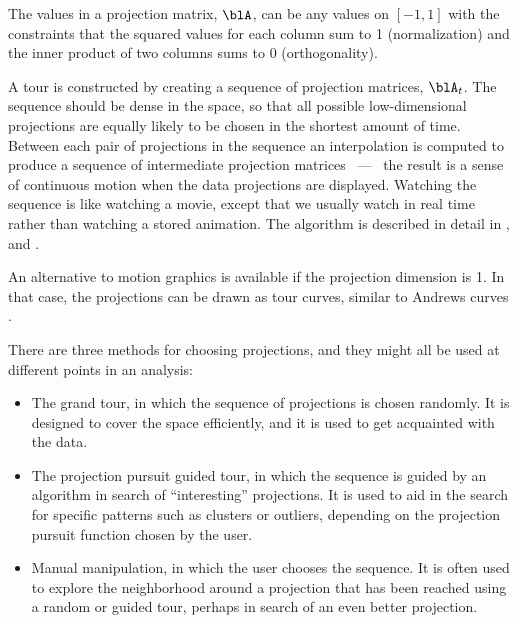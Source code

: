 The values in a projection matrix, $\blA$, can be any values on
$[-1,1]$ with the constraints that the squared values for each column
sum to 1 (normalization) and the inner product of two columns sums to
0 (orthogonality).

A tour  is constructed by creating a sequence of
projection matrices, $\blA_t$. The sequence should be dense in the
space, so that all possible low-dimensional projections are equally
likely to be chosen in the shortest amount of time. Between each pair
of projections in the sequence an interpolation is computed to produce
a sequence of intermediate projection matrices ~---~ the result is a
sense of continuous motion when the data projections are
displayed. Watching the sequence is like watching a movie, except that
we usually watch in real time rather than watching a stored
animation. The algorithm is described in detail in
, and .

An alternative to motion graphics is available if the projection
dimension is 1.  In that case, the projections can be drawn as tour
curves, similar to Andrews curves \cite{An72}.


\bigskip
{} 
There are three methods for choosing projections, and they might
all be used at different points in an analysis:

\begin{itemize}
\item The grand tour,  in which the sequence of
  projections is chosen randomly.  It is designed to cover the space
  efficiently, and it is used to get acquainted with the data.
\item The projection pursuit guided tour,  in which the sequence is guided by an algorithm in
search of ``interesting'' projections.  It is used to aid in the
search for specific patterns such as clusters or outliers, depending
on the projection pursuit function chosen by the user.
\item Manual manipulation,  in which the user
  chooses the sequence.  It is often used to explore the neighborhood
  around a projection that has been reached using a random or guided
  tour, perhaps in search of an even better projection.
\end{itemize}

